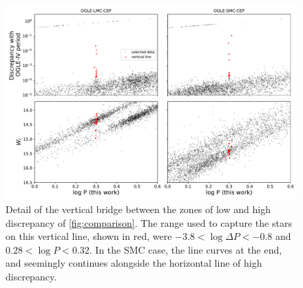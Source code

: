\begin{figure}
	\centering
	\includegraphics[width=\textwidth]{img/vertial_line_detail.pdf}
	\caption[Detail of the vertical line on the discrepancy plot]{
		Detail of the vertical bridge between the zones of low and high discrepancy of \autoref{fig:comparison}.
		The range used to capture the stars on this vertical line, shown in red, were $-3.8<\log \Delta P < -0.8$ and $0.28 < \log P < 0.32 $.
		In the SMC case, the line curves at the end, and seemingly continues alongside the horizontal line of high discrepancy.
	}
	\label{fig:vertical-discrepancy}
\end{figure}



